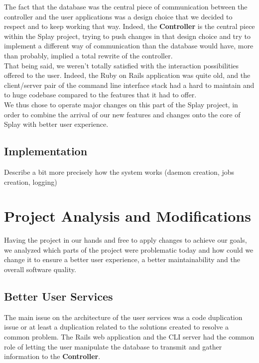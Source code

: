 \documentclass{eplmastersthesis}
\begin{document}
        The fact that the database was the central piece of communication
        between the controller and the user applications was a design choice
        that we decided to respect and to keep working that way. Indeed, the
        \textbf{Controller} is the central piece within the Splay project,
        trying to push changes in that design choice and try to implement a
        different way of communication than the database would have, more
        than probably, implied a total rewrite of the controller.\\

        That being said, we weren't totally satisfied with the interaction
        possibilities offered to the user. Indeed, the Ruby on Rails application
        was quite old, and the client/server pair of the command line interface
        stack had a hard to maintain and to huge codebase compared to the
        features that it had to offer.\\

        We thus chose to operate major changes on this part of the Splay
        project, in order to combine the arrival of our new features and
        changes onto the core of Splay with better user experience.

      \subsection{Implementation} %

        Describe a bit more precisely how the system works (daemon creation,
        jobs creation, logging)

    \section{Project Analysis and Modifications}

      Having the project in our hands and free to apply changes to achieve our
      goals, we analyzed which parts of the project were problematic today and
      how could we change it to ensure a better user experience, a better
      maintainability and the overall software quality.

      \subsection{Better User Services}

        The main issue on the architecture of the user services was a code
        duplication issue or at least a duplication related to the solutions
        created to resolve a common problem. The Rails web application and the
        CLI server had the common role of letting the user manipulate the
        database to transmit and gather information to the \textbf{Controller}.\\
\end{document}
